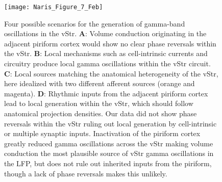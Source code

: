 \documentclass[11pt]{article}
\newcommand{\bsf}[1]{\textbf{#1}}
\begin{document}
\begin{figure}[h]
\centering
\texttt{[image: Naris\_Figure\_7\_Feb]}
\caption{Four possible scenarios for the generation of gamma-band
  oscillations in the vStr. \bsf{A}: Volume conduction originating in
  the adjacent piriform cortex would show no clear phase reversals
  within the vStr. \bsf{B}: Local mechanisms such as cell-intrinsic
  currents and circuitry produce local gamma oscillations within the
  vStr circuit.  \bsf{C}: Local sources matching the anatomical
  heterogeneity of the vStr, here idealized with two different
  afferent sources (orange and magenta). \bsf{D}: Rhythmic inputs from
  the adjacent piriform cortex lead to local generation within the
  vStr, which should follow anatomical projection densities.  Our data
  did not show phase reversals within the vStr ruling out local
  generation by cell-intrinsic or multiple synaptic inputs.
  Inactivation of the piriform cortex greatly reduced gamma
  oscillations across the vStr making volume conduction the most
  plausible source of vStr gamma oscillations in the LFP, but does not
  rule out inherited inputs from the piriform, though a lack of phase
  reversals makes this unlikely.}
\label{fig:schematic}
\end{figure}
\end{document}
